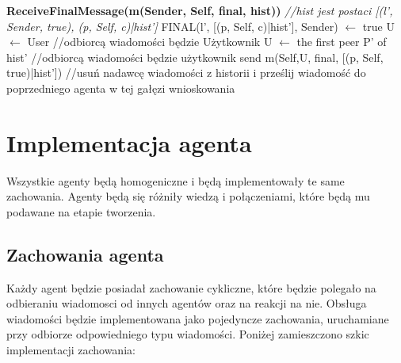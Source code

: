 \documentclass[a4paper,12pt]{mwart}
\begin{document}
\begin{algorithm}
\begin{algorithmic}
\STATE \textbf{ReceiveFinalMessage(m(Sender, Self, final, hist))}
\STATE \textit{//hist jest postaci [(l', Sender, true), (p, Self, c)|hist']}
\STATE FINAL(l', [(p, Self, c)|hist'], Sender) $\leftarrow$ true
\STATE U $\leftarrow$ User //odbiorcą wiadomości będzie Użytkownik
\ELSE
\STATE U $\leftarrow$ the first peer P' of hist' //odbiorcą wiadomości będzie użytkownik
\ENDIF
\ENDIF
\STATE send m(Self,U, final, [(p, Self, true)|hist']) //usuń nadawcę wiadomości z historii i prześlij wiadomość do poprzedniego agenta w tej gałęzi wnioskowania
\end{algorithmic}
\end{algorithm}
\section{Implementacja agenta}
Wszystkie agenty będą homogeniczne i będą implementowały te same zachowania. Agenty będą się różniły wiedzą i połączeniami, które będą mu podawane na etapie tworzenia.
\subsection{Zachowania agenta}
Każdy agent będzie posiadał zachowanie cykliczne, które będzie polegało na odbieraniu wiadomosci od innych agentów oraz na reakcji na nie. Obsługa wiadomości będzie implementowana jako pojedyncze zachowania, uruchamiane przy odbiorze odpowiedniego typu wiadomości. Poniżej zamieszczono szkic implementacji zachowania:
\end{document}
